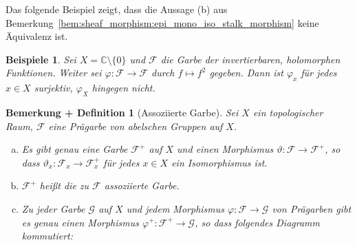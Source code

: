 \documentclass[a4paper,oneside]{scrbook}
\theoremstyle{break}
\newtheorem{BemDef}[Def]{Bemerkung + Definition}
\newtheorem{Bsp}[Def]{Beispiele}
\theoremstyle{nonumberbreak}
\theoremstyle{nonumberplain}
\theoremstyle{break}
\newcommand{\CC}{%
	\ensuremath{\mathbb{C}}%
}
\renewcommand{\phi}{%
	\ensuremath{\varphi}%
}
\renewcommand{\theta}{%
	\ensuremath{\vartheta}%
}
\begin{document}
Das folgende Beispiel zeigt, dass die Aussage (b) aus Bemerkung~\ref{bem:sheaf_morphism:epi_mono_iso_stalk_morphism} keine Äquivalenz ist.
\begin{Bsp}
	Sei $X = \CC \setminus \{0\}$ und $\mathcal{F}$ die Garbe der invertierbaren, holomorphen Funktionen.
	Weiter sei $\phi\colon \mathcal{F} \to \mathcal{F}$ durch $f \mapsto f^2$ gegeben. Dann ist $\phi_x$ für jedes $x \in X$ surjektiv, $\phi_X$ hingegen nicht.
\end{Bsp}



\begin{BemDef}[Assoziierte Garbe]\label{def:associated_sheaf}
	Sei $X$ ein topologischer Raum, $\mathcal{F}$ eine Prägarbe von abelschen Gruppen auf $X$.
	\begin{enumerate}[(a)]
		\item Es gibt genau eine Garbe $\mathcal{F}^+$ auf $X$ und einen Morphismus $\theta\colon \mathcal{F} \to \mathcal{F}^+$, so dass
			$\theta_x\colon \mathcal{F}_x \to \mathcal{F}^+_x$ für jedes $x \in X$ ein Isomorphismus ist.
		\item $\mathcal{F}^+$ heißt die zu $\mathcal{F}$ \emph{assoziierte Garbe}.
		\item Zu jeder Garbe $\mathcal{G}$ auf $X$ und jedem Morphismus $\phi\colon \mathcal{F} \to \mathcal{G}$ von Prägarben gibt es genau einen Morphismus $\phi^+\colon \mathcal{F}^+ \to \mathcal{G}$, so dass folgendes Diagramm kommutiert:
		\begin{center}
		\end{center}
	\end{enumerate}
\end{BemDef}
\end{document}
